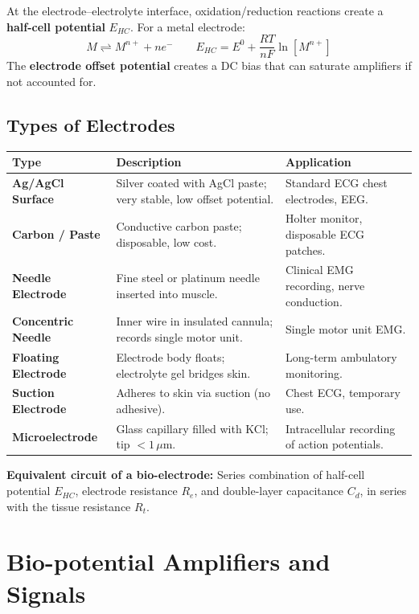 \documentclass[12pt,a4paper]{article}
\begin{document}
At the electrode--electrolyte interface, oxidation/reduction reactions create a \textbf{half-cell potential} $E_{HC}$. For a metal electrode:
\[
M \rightleftharpoons M^{n+} + ne^- \qquad E_{HC} = E^0 + \frac{RT}{nF}\ln[M^{n+}]
\]
The \textbf{electrode offset potential} creates a DC bias that can saturate amplifiers if not accounted for.

\subsection{Types of Electrodes}

\par\noindent
\begin{tabularx}{\linewidth}{|B{2.8cm}|Y|Y|}
\hline
\textbf{Type} & \textbf{\color{myteal}Description} & \textbf{\color{mygreen}Application} \\
\hline
\textbf{Ag/AgCl Surface} & Silver coated with AgCl paste; very stable, low offset potential. & Standard ECG chest electrodes, EEG. \\
\hline
\textbf{Carbon / Paste} & Conductive carbon paste; disposable, low cost. & Holter monitor, disposable ECG patches. \\
\hline
\textbf{Needle Electrode} & Fine steel or platinum needle inserted into muscle. & Clinical EMG recording, nerve conduction. \\
\hline
\textbf{Concentric Needle} & Inner wire in insulated cannula; records single motor unit. & Single motor unit EMG. \\
\hline
\textbf{Floating Electrode} & Electrode body floats; electrolyte gel bridges skin. & Long-term ambulatory monitoring. \\
\hline
\textbf{Suction Electrode} & Adheres to skin via suction (no adhesive). & Chest ECG, temporary use. \\
\hline
\textbf{Microelectrode} & Glass capillary filled with KCl; tip $< 1\,\mu\text{m}$. & Intracellular recording of action potentials. \\
\hline
\end{tabularx}

\textbf{Equivalent circuit of a bio-electrode:} Series combination of half-cell potential $E_{HC}$, electrode resistance $R_e$, and double-layer capacitance $C_d$, in series with the tissue resistance $R_t$.

\section{Bio-potential Amplifiers and Signals}
\end{document}
